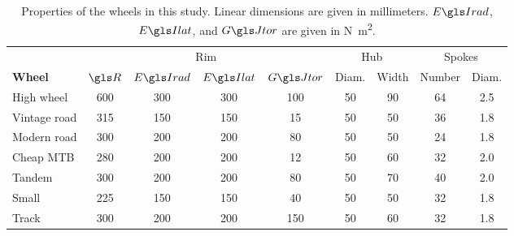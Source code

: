 \documentclass[../../thesis.tex]{subfiles}
\begin{document}
\begin{table}
\caption[Wheel properties for buckling simulations]{Properties of the wheels in this study. Linear dimensions are given in millimeters. $\EIr$, $\EIl$, and $\GJ$ are given in \si{N.m^2}.}
\label{tab:example_wheel_props}
\begin{tabular}{lcccccccc}
\toprule
&\multicolumn{4}{c}{Rim} & \multicolumn{2}{c}{Hub} & \multicolumn{2}{c}{Spokes}\\
\cmidrule(r){2-5}
\cmidrule(r){6-7}
\cmidrule(r){8-9}
\bf{Wheel} & $\R$ & $\EIr$ & $\EIl$ & $\GJ$ & Diam. & Width & Number & Diam.\\
\midrule
High wheel   & 600 & 300 & 300 & 100 & 50 & 90 & 64 & 2.5\\
Vintage road & 315 & 150 & 150 & 15  & 50 & 50 & 36 & 1.8\\
Modern road  & 300 & 200 & 200 & 80  & 50 & 50 & 24 & 1.8\\
Cheap MTB    & 280 & 200 & 200 & 12  & 50 & 60 & 32 & 2.0\\
Tandem       & 300 & 200 & 200 & 80  & 50 & 70 & 40 & 2.0\\
Small        & 225 & 150 & 150 & 40  & 50 & 50 & 32 & 1.8\\
Track        & 300 & 200 & 200 & 150 & 50 & 60 & 32 & 1.8\\
\bottomrule
\end{tabular}
\end{table}
\end{document}
